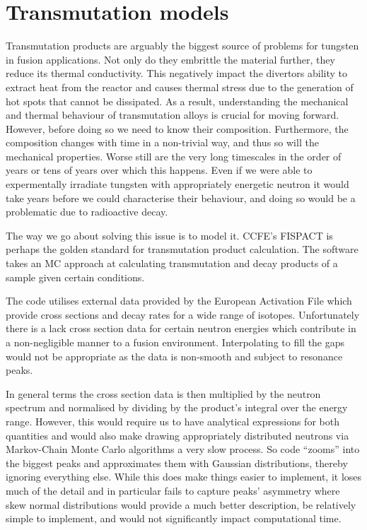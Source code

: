 \documentclass[12pt, a4paper]{article}
\begin{document}
	\section{Transmutation models}\label{s:tm}
		Transmutation products are arguably the biggest source of problems for tungsten in fusion applications. Not only do they embrittle the material further, they reduce its thermal conductivity. This negatively impact the divertors ability to extract heat from the reactor and causes thermal stress due to the generation of hot spots that cannot be dissipated. As a result, understanding the mechanical and thermal behaviour of transmutation alloys is crucial for moving forward. However, before doing so we need to know their composition. Furthermore, the composition changes with time in a non-trivial way, and thus so will the mechanical properties. Worse still are the very long timescales in the order of years or tens of years over which this happens. Even if we were able to expermentally irradiate tungsten with appropriately energetic neutron it would take years before we could characterise their behaviour, and doing so would be a problematic due to radioactive decay.
		
		The way we go about solving this issue is to model it. CCFE's FISPACT is perhaps the golden standard for transmutation product calculation. The software takes an MC approach at calculating transmutation and decay products of a sample given certain conditions.
		
		The code utilises external data provided by the European Activation File which provide cross sections and decay rates for a wide range of isotopes. Unfortunately there is a lack cross section data for certain neutron energies which contribute in a non-negligible manner to a fusion environment. Interpolating to fill the gaps would not be appropriate as the data is non-smooth and subject to resonance peaks.
		
		In general terms the cross section data is then multiplied by the neutron spectrum and normalised by dividing by the product's integral over the energy range. However, this would require us to have analytical expressions for both quantities and would also make drawing appropriately distributed neutrons via Markov-Chain Monte Carlo algorithms a very slow process. So code ``zooms'' into the biggest peaks and approximates them with Gaussian distributions, thereby ignoring everything else. While this does make things easier to implement, it loses much of the detail and in particular fails to capture peaks' asymmetry where skew normal distributions would provide a much better description, be relatively simple to implement, and would not significantly impact computational time.
		
\end{document}
